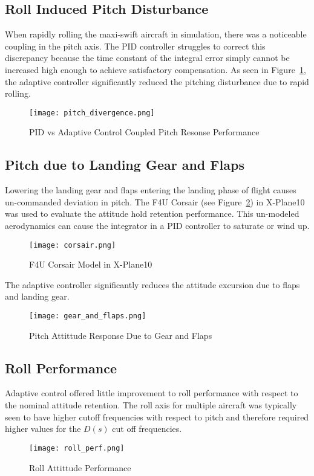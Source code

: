 \subsection{Roll Induced Pitch Disturbance}
When rapidly rolling the maxi-swift aircraft in simulation, there was a noticeable coupling in the pitch axis.  The \ac{PID} controller struggles to correct this discrepancy because the time constant of the integral error simply cannot be increased high enough to achieve satisfactory compensation.  As seen in Figure~\ref{fig:pitch_divergence}, the \Lone adaptive controller significantly reduced the pitching disturbance due to rapid rolling.

\begin{figure}[h!]
 \centering
  \texttt{[image: pitch\_divergence.png]}
  \caption{PID vs \Lone Adaptive Control Coupled Pitch Resonse Performance}
  \label{fig:pitch_divergence}
\end{figure}

\subsection{Pitch due to Landing Gear and Flaps}
Lowering the landing gear and flaps entering the landing phase of flight causes un-commanded deviation in pitch.  The F4U Corsair (see Figure~\ref{fig:corsair}) in X-Plane10 was used to evaluate the attitude hold retention performance.  This un-modeled aerodynamics can cause the integrator in a \ac{PID} controller to saturate or wind up. 

\begin{figure}[h!]
 \centering
  \texttt{[image: corsair.png]}
  \caption{F4U Corsair Model in X-Plane10}
  \label{fig:corsair}
\end{figure}

The \Lone adaptive controller significantly reduces the attitude excursion due to flaps and landing gear.
\begin{figure}[h!]
 \centering
  \texttt{[image: gear\_and\_flaps.png]}
  \caption{Pitch Attittude Response Due to Gear and Flaps}
  \label{fig:gear_and_flaps}
\end{figure}

\subsection{Roll Performance}
Adaptive control offered little improvement to roll performance with respect to the nominal attitude retention.  The roll axis for multiple aircraft was typically seen to have higher cutoff frequencies with respect to pitch and therefore required higher values for the $D(s)$ cut off frequencies.
\begin{figure}[h!]
 \centering
  \texttt{[image: roll\_perf.png]}
  \caption{Roll Attittude Performance}
  \label{fig:roll_perf}
\end{figure}

